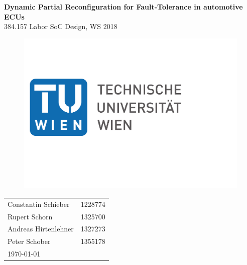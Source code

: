\begin{titlepage}

\begin{doublespace} 
\begin{center}
    \vspace*{35mm}
    {\LARGE\textbf{Dynamic Partial Reconfiguration for Fault-Tolerance in automotive ECUs}}\\
    \vspace*{5mm}
    {\large 384.157 Labor SoC Design, WS 2018}
    \vspace*{20mm}
\end{center}
\end{doublespace}

\begin{figure}[H]
    \begin{center}
    	\includegraphics[scale=0.3]{./figures/TU_logo.pdf}
	    \label{fig:logo}
    \end{center}
\end{figure}

\vfill

\begin{tabular}{ll} 
    Constantin Schieber & 1228774\\[1mm]
    Rupert Schorn & 1325700\\[1mm]
    Andreas Hirtenlehner & 1327273\\[1mm]
    Peter Schober & 1355178\\[5mm]
    \multicolumn{2}{l}{\today} 
\end{tabular}

\end{titlepage}
